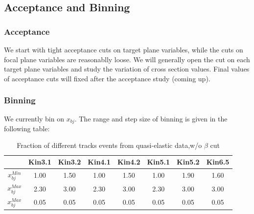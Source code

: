 \documentclass[a4paper,10.5pt]{report}
\begin{document}

\subsection{Acceptance and Binning}
 
\subsubsection{Acceptance}
We start with tight acceptance cuts on target plane variables, while the cuts on focal plane variables are reasonablly loose. We will generally open the cut on each target plane variables and study the variation of cross section values. Final values of acceptance cuts will fixed after the acceptance study (coming up).

\subsubsection{Binning}
 We currently bin on $x_{bj}$. The range and step size of binning is given in the following table:
\begin{table}[!ht]
\centering
\begin{tabular}{|c||ccccccc|}
  \hline
  \textbf{}        & Kin3.1 & Kin3.2 & Kin4.1 & Kin4.2 & Kin5.1 & Kin5.2 & Kin6.5 \\
  \hline \hline
  $x_{bj}^{Min}$   & 1.00   & 1.50   & 1.00   & 1.50   & 1.00   & 1.90   & 1.60   \\
        \hline
  $x_{bj}^{Max}$   & 2.30   & 3.00   & 2.30   & 3.00   & 2.30   & 3.00   & 3.00   \\
  \hline
  $x_{bj}^{Max}$   & 0.05   & 0.05   & 0.05   & 0.05   & 0.05   & 0.05   & 0.05   \\
  \hline \hline
\end{tabular}
\caption{Fraction of different tracks events from quasi-elastic data,w/o $\beta$ cut}
\label{bin_table}	
\end{table}
\end{document}
